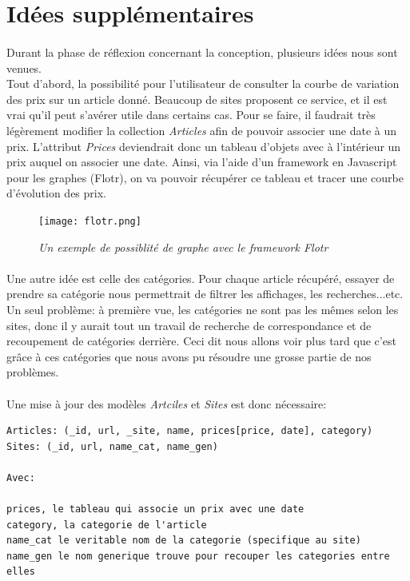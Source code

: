\documentclass{report}
\begin{document}
\newpage
\section{Idées supplémentaires}

\paragraph{}
Durant la phase de réflexion concernant la conception, plusieurs idées nous sont venues.\\
Tout d'abord, la possibilité pour l'utilisateur de consulter la courbe de variation des prix sur un article donné. Beaucoup de sites proposent ce service, et il est vrai qu'il peut s'avérer utile dans certains cas. Pour se faire, il faudrait très légèrement modifier la collection \textit{Articles} afin de pouvoir associer une date à un prix. L'attribut \textit{Prices} deviendrait donc un tableau d'objets avec à l'intérieur un prix auquel on associer une date. Ainsi, via l'aide d'un framework en Javascript pour les graphes (Flotr), on va pouvoir récupérer ce tableau et tracer une courbe d'évolution des prix.

\begin{figure}[H]
\begin{center}
\texttt{[image: flotr.png]}
\caption{\textit{Un exemple de possiblité de graphe avec le framework Flotr}}
\end{center}
\end{figure}


\paragraph{}
Une autre idée est celle des catégories. Pour chaque article récupéré, essayer de prendre sa catégorie nous permettrait de filtrer les affichages, les recherches...etc. Un seul problème: à première vue, les catégories ne sont pas les mêmes selon les sites, donc il y aurait tout un travail de recherche de correspondance et de recoupement de catégories derrière. Ceci dit nous allons voir plus tard que c'est grâce à ces catégories que nous avons pu résoudre une grosse partie de nos problèmes.

\newpage
\paragraph{}
Une mise à jour des modèles \textit{Artciles} et \textit{Sites} est donc nécessaire:

\begin{lstlisting}
Articles: (_id, url, _site, name, prices[price, date], category)
Sites: (_id, url, name_cat, name_gen)

Avec:

prices, le tableau qui associe un prix avec une date
category, la categorie de l'article
name_cat le veritable nom de la categorie (specifique au site)
name_gen le nom generique trouve pour recouper les categories entre elles 
\end{lstlisting}
\end{document}
